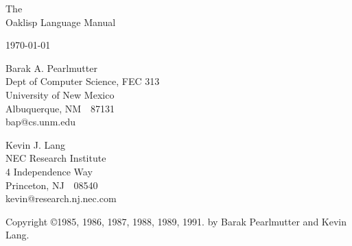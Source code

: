 \begin{titlepage}

\begin{center}

\vspace*{1in}

\Huge
 The \\
 Oaklisp Language Manual \\

\vspace{.5in}

\large
 \today \\

\vspace{.25in}


\vspace{.5in}

\Large
 Barak A. Pearlmutter \\
\large
 Dept of Computer Science, FEC 313\\
 University of New Mexico\\
 Albuquerque, NM~~87131\\
 bap@cs.unm.edu\\

\vspace{.5in}

\Large
 Kevin J. Lang \\
\large
 NEC Research Institute \\
 4 Independence Way \\
 Princeton, NJ~~08540 \\
 kevin@research.nj.nec.com

\vfill

\normalsize
 Copyright \copyright 1985, 1986, 1987, 1988, 1989, 1991.
 by Barak Pearlmutter and Kevin Lang.


\end{center}

\end{titlepage}
